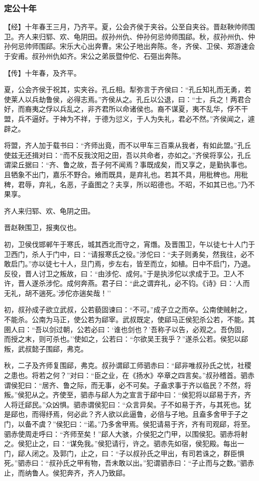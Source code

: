 \documentclass[]{article}
\begin{document}
\hypertarget{header-n2982}{%
\subsubsection{定公十年}\label{header-n2982}}

【经】十年春王三月，乃齐平。夏，公会齐侯于夹谷。公至自夹谷。晋赵鞅帅师围卫。齐人来归郓、欢、龟阴田。叔孙州仇、仲孙何忌帅师围郈。秋，叔孙州仇、仲孙何忌帅师围郈。宋乐大心出奔曹。宋公子地出奔陈。冬，齐侯、卫侯、郑游速会于安甫。叔孙州仇如齐。宋公之弟辰暨仲佗、石彄出奔陈。

【传】十年春，及齐平。

夏，公会齐侯于祝其，实夹谷。孔丘相。犁弥言于齐侯曰：``孔丘知礼而无勇，若使莱人以兵劫鲁侯，必得志焉。''齐侯从之。孔丘以公退，曰：``士，兵之！两君合好，而裔夷之俘以兵乱之，非齐君所以命诸侯也。裔不谋夏，夷不乱华，俘不干盟，兵不逼好。于神为不祥，于德为愆义，于人为失礼，君必不然。''齐侯闻之，遽辟之。

将盟，齐人加于载书曰：``齐师出竟，而不以甲车三百乘从我者，有如此盟。''孔丘使兹无还揖对曰：``而不反我汶阳之田，吾以共命者，亦如之。''齐侯将享公，孔丘谓梁丘据曰：``齐、鲁之故，吾子何不闻焉？事既成矣，而又享之，是勤执事也。且牺象不出门，嘉乐不野合。飨而既具，是弃礼也。若其不具，用秕稗也。用秕稗，君辱，弃礼，名恶，子盍图之？夫享，所以昭德也。不昭，不如其已也。''乃不果享。

齐人来归郓、欢、龟阴之田。

晋赵鞅围卫，报夷仪也。

初，卫侯伐邯郸午于寒氏，城其西北而守之，宵熸。及晋围卫，午以徒七十人门于卫西门，杀人于门中，曰：``请报寒氏之役。''涉佗曰：``夫子则勇矣，然我往，必不敢启门。''亦以徒七十人，旦门焉，步左右，皆至而立，如植。日中不启门，乃退。反役，晋人讨卫之叛故，曰：``由涉佗、成何。''于是执涉佗以求成于卫。卫人不许，晋人遂杀涉佗。成何奔燕。君子曰：``此之谓弃礼，必不钧。《诗》曰：`人而无礼，胡不遄死。'涉佗亦遄矣哉！''

初，叔孙成子欲立武叔，公若藐固谏曰：``不可。''成子立之而卒。公南使贼射之，不能杀。公南为马正，使公若为郈宰。武叔既定，使郈马正侯犯杀公若，不能。其圉人曰：``吾以剑过朝，公若必曰：`谁也剑也？'吾称子以告，必观之。吾伪固，而授之末，则可杀也。''使如之，公若曰：``尔欲吴王我乎？''遂杀公若。侯犯以郈叛，武叔懿子围郈，弗克。

秋，二子及齐师复围郈，弗克。叔孙谓郈工师驷赤曰：``郈非唯叔孙氏之忧，社稷之患也。将若之何？''对曰：``臣之业，在《扬水》卒章之四言矣。''叔孙稽首。驷赤谓侯犯曰：``居齐、鲁之际，而无事，必不可矣。子盍求事于齐以临民？不然，将叛。''侯犯从之。齐使至，驷赤与郈人为之宣言于郈中曰：``侯犯将以郈易于齐，齐人将迁郈民。''众凶惧。驷赤谓侯犯曰：``众言异矣。子不如易于齐，与其死也。犹是郈也，而得纾焉，何必此？齐人欲以此逼鲁，必倍与子地。且盍多舍甲于子之门，以备不虞？''侯犯曰：``诺。''乃多舍甲焉。侯犯请易于齐，齐有司观郈，将至。驷赤使周走呼曰：``齐师至矣！''郈人大骇，介侯犯之门甲，以围侯犯。驷赤将射之。侯犯止之，曰：``谋免我。''侯犯请行，许之。驷赤先如宿，侯犯殿。每出一门，郈人闭之。及郭门，止之，曰：``子以叔孙氏之甲出，有司若诛之，群臣惧死。''驷赤曰：``叔孙氏之甲有物，吾未敢以出。''犯谓驷赤曰：``子止而与之数。''驷赤止，而纳鲁人。侯犯奔齐，齐人乃致郈。
\end{document}
